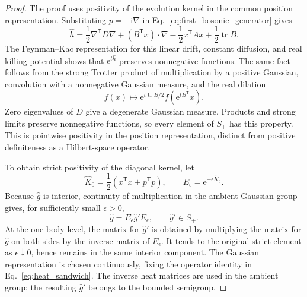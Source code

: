 \documentclass[11pt,a4paper]{article}
\newcommand{\tr}{\operatorname{tr}}
\newcommand{\ee}{\mathrm e}
\newcommand{\ii}{\mathrm i}
\newcommand{\trans}{\mathsf T}
\theoremstyle{remark}
\numberwithin{equation}{section}
\begin{document}
\begin{proof}
The proof uses positivity of the evolution kernel in the common position
representation. Substituting \(p=-\ii\nabla\) in
Eq.~\eqref{eq:first_bosonic_generator} gives
\begin{equation}
\hat h=\frac12\nabla^\trans D\nabla
+(B^\trans x)\cdot\nabla
-\frac12x^\trans A x+\frac12\tr B.
\label{eq:parabolic_generator}
\end{equation}
The Feynman--Kac representation for this linear drift, constant diffusion,
and real killing potential shows that \(\ee^{t\hat h}\) preserves
nonnegative functions. The same fact follows from the strong Trotter product
of multiplication by a positive Gaussian, convolution with a nonnegative
Gaussian measure, and the real dilation
\begin{equation}
f(x)\longmapsto\ee^{t\tr B/2}f(\ee^{tB^\trans}x).
\label{eq:positive_dilation}
\end{equation}
Zero eigenvalues of \(D\) give a degenerate Gaussian measure. Products and
strong limits preserve nonnegative functions, so every element of \(S_+\)
has this property. This is pointwise positivity in the position
representation, distinct from positive definiteness as a Hilbert-space
operator.

To obtain strict positivity of the diagonal kernel, let
\begin{equation}
\hat K_0=\frac12(x^\trans x+p^\trans p),\qquad
E_\epsilon=\ee^{-\epsilon\hat K_0}.
\end{equation}
Because \(\hat g\) is interior, continuity of multiplication in the
ambient Gaussian group gives, for sufficiently small \(\epsilon>0\),
\begin{equation}
\hat g=E_\epsilon\hat g' E_\epsilon,
\qquad \hat g'\in S_+.
\label{eq:heat_sandwich}
\end{equation}
At the one-body level, the matrix for \(\hat g'\) is obtained by
multiplying the matrix for \(\hat g\) on both sides by the inverse matrix
of \(E_\epsilon\). It tends to the original strict element as
\(\epsilon\downarrow0\), hence remains in the same interior component.
The Gaussian representation is chosen continuously, fixing the operator
identity in Eq.~\eqref{eq:heat_sandwich}. The inverse heat matrices are
used in the ambient group; the resulting \(\hat g'\) belongs to the
bounded semigroup.


\end{proof}
\end{document}
